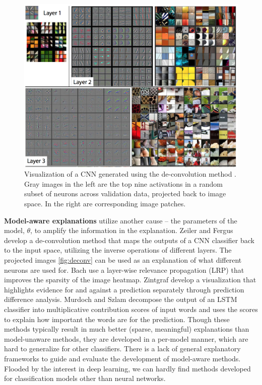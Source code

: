 \begin{figure}[tb]
  \centering
  \includegraphics[width=1.0\textwidth]{figure/deconv}
  \caption{Visualization of a CNN generated using the de-convolution method \cite{zeiler2014eccv}. Gray images in the left are the top nine activations in a random subset of neurons across validation data, projected back to image space. In the right are corresponding image patches.}
  \label{fig:deconv}
\end{figure}

\textbf{Model-aware explanations} utilize another cause -- the parameters of the model, $\theta$, to amplify the information in the explanation. Zeiler and Fergus \cite{zeiler2014eccv} develop a de-convolution method that maps the outputs of a CNN classifier back to the input space, utilizing the inverse operations of different layers. The projected images \autoref{fig:deconv} can be used as an explanation of what different neurons are used for. Bach \etal \cite{bach15plos} use a layer-wise relevance propagation (LRP) that improves the sparsity of the image heatmap. Zintgraf \etal \cite{zintgraf17visualize} develop a visualization that highlights evidence for and against a prediction separately through prediction difference analysis. Murdoch and Szlam \cite{murdoch2017rule} decompose the output of an LSTM classifier into multiplicative contribution scores of input words and uses the scores to explain how important the words are for the prediction. Though these methods typically result in much better (sparse, meaningful) explanations than model-unaware methods, they are developed in a per-model manner, which are hard to generalize for other classifiers. There is a lack of general explanatory frameworks to guide and evaluate the development of model-aware methods. Flooded by the interest in deep learning, we can hardly find methods developed for classification models other than neural networks.

